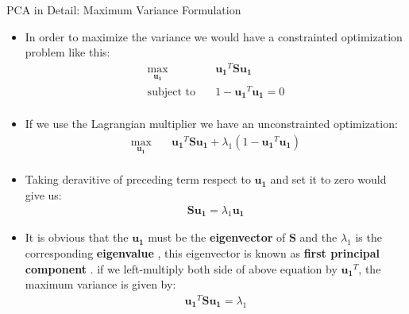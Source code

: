 \documentclass[compress,oilve]{beamer}
\newcommand{\tc}[2]{
 \textcolor{#1}{\textbf{#2}}
}
\begin{document}
\begin{frame}{PCA in Detail: Maximum Variance Formulation}
\begin{itemize}
\item In order to maximize the variance we would have a constrainted optimization problem like this:
\begin{equation}
\begin{aligned}
\max_{\mathbf{u_{1}}} \quad & \mathbf{u_{1}}^{T} \mathbf{S}\mathbf{u_{1}}\\
\textrm{subject to} \quad & 1 - \mathbf{u_{1}}^{T}\mathbf{u_{1}} = 0\\
\end{aligned}
\end{equation}
\item If we use the Lagrangian multiplier we have an unconstrainted optimization:
\begin{equation}
\begin{aligned}
\max_{\mathbf{u_{1}}} \quad & \mathbf{u_{1}}^{T} \mathbf{S}\mathbf{u_{1}} + \lambda_{1}(1 - \mathbf{u_{1}}^{T}\mathbf{u_{1}})\\
\end{aligned}
\end{equation}
\item Taking deravitive of preceding term respect to $\mathbf{u_{1}}$ and set it to zero would give us:
\begin{equation}
\begin{aligned}
\mathbf{S} \mathbf{u_{1}} = \lambda_{1}\mathbf{u_{1}}
\end{aligned}
\end{equation}

\item It is obvious that the $ \mathbf{u_{1}} $ must be the \tc{keywords}{eigenvector} of $ \mathbf{S} $ and the $ \lambda_{1}$ is the corresponding \tc{keywords}{eigenvalue} , this eigenvector is known as \tc{keywords}{first principal component}. if we left-multiply both side of above equation by $\mathbf{u_{1}}^{T}$, the maximum variance is given by:
\begin{equation}
\begin{aligned}
\mathbf{u_{1}}^{T}\mathbf{S} \mathbf{u_{1}} = \lambda_{1}
\end{aligned}
\end{equation}
\end{itemize}



\end{frame}
\end{document}
